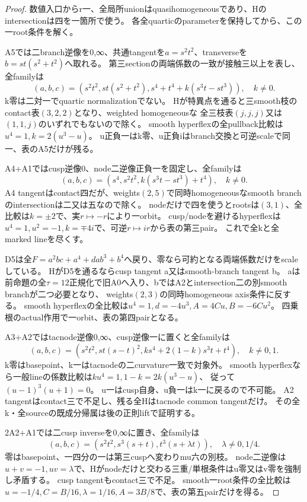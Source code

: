 \documentclass[a4paper,11pt]{ltjsarticle}
\theoremstyle{definition}
\begin{document}
\begin{proof}
数値入口からr一、全局所unionはquasihomogeneousであり、Hのintersectionは四を一箇所で使う。
各全quarticのparameterを保持してから、この一root条件を解く。

A5では二branch逆像を0,∞、共通tangentを$a=s^2t^2$、transverseを$b=st(s^2+t^2)$へ取れる。
第三sectionの両端係数の一致が接触三以上を表し、全familyは
\[
 (a,b,c)=(s^2t^2,st(s^2+t^2),s^4+t^4+k(s^3t-st^3)),\quad k\ne0.
\]
k零は二対一でquartic normalizationでない。
Hが特異点を通ると三smooth枝のcontact表$(3,2,2)$となり、weighted homogeneousな
全三枝表$(j,j,j)$又は$(1,1,j)$のいずれでもないので除く。
smooth hyperflexの全pullback比較は$u^4=1,k=2(u^3-u)$。
u正負一はk零、u正負iはbranch交換と可逆scaleで同一、表のA5だけが残る。

A4+A1ではcusp逆像0、node二逆像正負一を固定し、全familyは
\[
 (a,b,c)=(s^4,s^2t^2,k(s^3t-st^3)+t^4),\quad k\ne0.
\]
A4 tangentはcontact四だが、weights$(2,5)$で同時homogeneousなsmooth branchのintersectionは二又は五なので除く。
nodeだけで四を使うとrootsは$(3,1)$、全比較は$k=\pm2$で、実$r\mapsto-r$により一orbit。
cusp/nodeを避けるhyperflexは$u^4=1,u^2=-1,k=\mp4i$で、可逆$r\mapsto ir$から表の第三pair。
これで全kと全marked lineを尽くす。

D5は全$F=a^2bc+a^4+dab^3+b^4$へ戻り、零なら可約となる両端係数だけをscaleしている。
HがD5を通るならcusp tangent a又はsmooth-branch tangent b。
aは前命題の全$\tau=12$正規化で旧A0へ入り、bではA2とintersection二の別smooth branchが二つ必要となり、
weights$(2,3)$の同時homogeneous axis条件に反する。
smooth hyperflexの全比較は$u^4=1,d=-4u^3,A=4Cu,B=-6Cu^2$。
四乗根のactual作用で一orbit、表の第四pairとなる。

A3+A2ではtacnode逆像0,∞、cusp逆像一に置くと全familyは
\[
 (a,b,c)=(s^2t^2,st(s-t)^2,ks^4+2(1-k)s^3t+t^4),\quad k\ne0,1.
\]
k零はbasepoint、k一はtacnodeの二curvature一致で対象外。
smooth hyperflexなら一般lineの係数比較は$ku^4=1,1-k=2k(u^3-u)$、
従って$(u-1)^3(u+1)=0$。
u一はcusp自身、u負一はk一に戻るので不可能。
A2 tangentはcontact三で不足し、残る全Hはtacnode common tangentだけ。
その全k・全sourceの既成分帰属は後の正則liftで証明する。

2A2+A1では二cusp inverseを0,∞に置き、全familyは
\[
 (a,b,c)=(s^2t^2,s^3(s+t),t^3(s+\lambda t)),\quad\lambda\ne0,1/4.
\]
零はbasepoint、一四分の一は第三cuspへ変わりmu六の別枝。
node二逆像は$u+v=-1,uv=\lambda$で、Hがnodeだけと交わる三重/単根条件はu零又はv零を強制し矛盾する。
cusp tangentもcontact三で不足。
smooth一root条件の全比較は$u=-1/4,C=B/16,\lambda=1/16,A=3B/8$で、表の第五pairだけを得る。


\end{proof}
\end{document}
